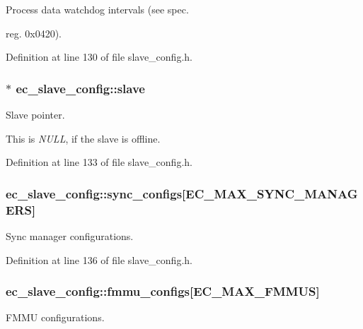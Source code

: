 Process data watchdog intervals (see spec. 

reg. 0x0420). 

Definition at line 130 of file slave\-\_\-config.\-h.

\subsubsection[{slave}]{$\ast$ ec\-\_\-slave\-\_\-config\-::slave}\label{structec__slave__config_ad1c2b1916ca2208c52cf0acbf6f1a8c7}


Slave pointer. 

This is {\itshape N\-U\-L\-L}, if the slave is offline. 

Definition at line 133 of file slave\-\_\-config.\-h.

\subsubsection[{sync\-\_\-configs}]{ ec\-\_\-slave\-\_\-config\-::sync\-\_\-configs[{\bf E\-C\-\_\-\-M\-A\-X\-\_\-\-S\-Y\-N\-C\-\_\-\-M\-A\-N\-A\-G\-E\-R\-S}]}\label{structec__slave__config_a28bf292a581f2af8696f41fa333ba0f3}


Sync manager configurations. 



Definition at line 136 of file slave\-\_\-config.\-h.

\subsubsection[{fmmu\-\_\-configs}]{ ec\-\_\-slave\-\_\-config\-::fmmu\-\_\-configs[{\bf E\-C\-\_\-\-M\-A\-X\-\_\-\-F\-M\-M\-U\-S}]}\label{structec__slave__config_a87548f86b5a467a0d2da312571bac4c0}


F\-M\-M\-U configurations. 



